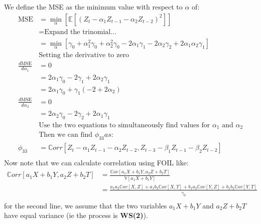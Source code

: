 We define the MSE as the minimum value with respect to $ \alpha$ of:
\begin{equation*}
    \begin{aligned}
        \text{MSE} &= \min_{\alpha}\left[\mathbb{E}\left[(Z_{t} - \alpha_{1}
        Z_{t-1} - \alpha_{2} Z_{t-2})^{2}\right] \right] \\
                   &= \text{Expand the trinomial...} \\
                   &= \min_{\alpha} \left[ \gamma_{0} +
                   \alpha_{1}^{2}\gamma_{0} + \alpha_{2}^{2}\gamma_{0} -
               2\alpha_{1}\gamma_{1} - 2\alpha_{2}\gamma_{2} +
           2\alpha_{1}\alpha_{2}\gamma_{1} \right] \\
                   & \text{Setting the derivative to zero} \\
                \frac{d \text{MSE}}{d \alpha_{1}} &= 0 \\
                    &= 2 \alpha_{1}\gamma_{0} - 2 \gamma_{1} + 2\alpha_{2}\gamma_{1} \\
                    &= 2\alpha_{1}\gamma_{0} + \gamma_{1}\left( -2 + 2\alpha_{2} \right) \\
                \frac{d \text{MSE}}{d \alpha_{2}} &= 0 \\
                    &= 2\alpha_{2}\gamma_{0} - 2\gamma_{2} + 2 \alpha_{1}\gamma_{1} \\
                    & \text{Use the two equations to simultaneously find values for $\alpha_{1}$ and $\alpha_{2}$} \\
                    & \text{Then we can find $\phi_{33} as:$} \\
                    \phi_{33} &= \mathbb{C}orr\left[Z_{t} - \alpha_{1}Z_{t-1} -
                    \alpha_{2}Z_{t-2}, Z_{t-3} - \beta_{1}Z_{t-1} -
                \beta_{2}Z_{t-2}\right] \\
    \end{aligned}
\end{equation*}
Now note that we can calculate correlation using FOIL like:
\begin{equation*}
    \begin{aligned}
        \mathbb{C}orr\left[a_{1}X + b_{1}Y, a_{2}Z + b_{2}T\right] &= \frac{
\mathbb{C}ov\left[a_{1}X + b_{1}Y, a_{2}Z + b_{2}T\right] 
        }{
\mathbb{V}\left[a_{1}X + b_{1}Y\right] 
    } \\
    &= \frac{a_{1}a_{2} \mathbb{C}ov\left[X, Z\right] + a_{1}b_{2}
    \mathbb{C}ov\left[X, T\right] +b_{1}a_{2} \mathbb{C}ov\left[Y, Z\right] +
b_{1}b_{2} \mathbb{C}ov\left[Y, T\right] }{\gamma_{0}} \\
    \end{aligned}
\end{equation*}
for the second line, we assume that the two variables $a_{1}X + b_{1}Y$
and $a_{2}Z + b_{2}T$ have equal variance (ie the process is \textbf{WS(2)}).

